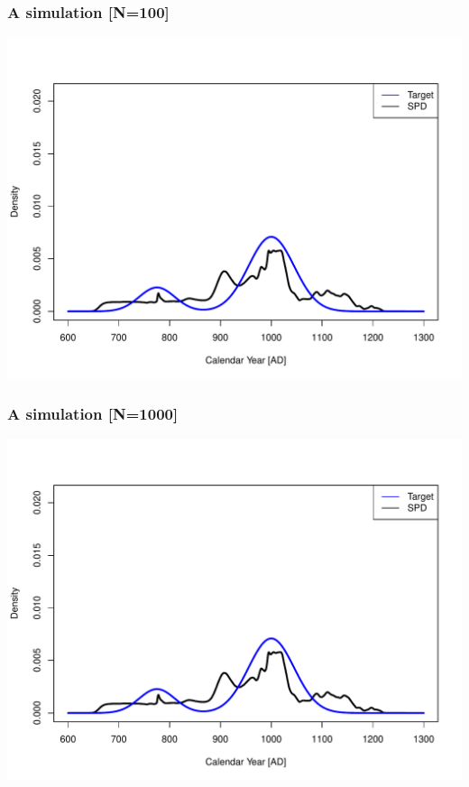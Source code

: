 \documentclass{beamer}
\begin{document}
\begin{frame}[t]
  \frametitle{A simulation [N=100]}
    \includegraphics[height=.85\textheight]{sim_target_spd_10000.pdf}
\end{frame}

\begin{frame}[t]
  \frametitle{A simulation [N=1000]}
    \includegraphics[height=.85\textheight]{sim_target_spd_10000.pdf}
\end{frame}
\end{document}
